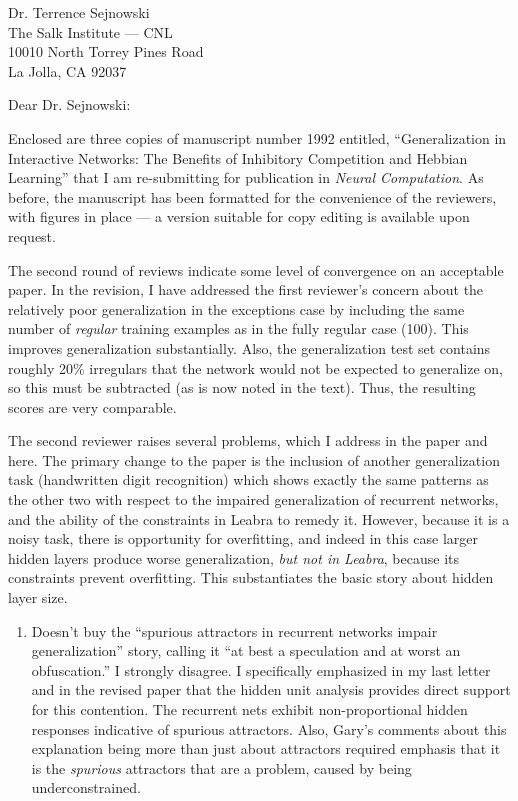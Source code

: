 \documentclass [11pt]{letter}
\begin{document}
\begin{letter}
{Dr. Terrence Sejnowski\\
The Salk Institute --- CNL\\
10010 North Torrey Pines Road\\
La Jolla, CA 92037\\}

\opening{Dear Dr. Sejnowski:}

Enclosed are three copies of manuscript number 1992 entitled,
``Generalization in Interactive Networks: The Benefits of Inhibitory
Competition and Hebbian Learning'' that I am re-submitting for
publication in {\em Neural Computation}.  As before, the manuscript
has been formatted for the convenience of the reviewers, with figures
in place --- a version suitable for copy editing is available upon
request.

The second round of reviews indicate some level of convergence on an
acceptable paper.  In the revision, I have addressed the first
reviewer's concern about the relatively poor generalization in the
exceptions case by including the same number of {\em regular} training
examples as in the fully regular case (100).  This improves
generalization substantially.  Also, the generalization test set
contains roughly 20\% irregulars that the network would not be
expected to generalize on, so this must be subtracted (as is now noted
in the text).  Thus, the resulting scores are very comparable.

The second reviewer raises several problems, which I address in the
paper and here.  The primary change to the paper is the inclusion of
another generalization task (handwritten digit recognition) which
shows exactly the same patterns as the other two with respect to the
impaired generalization of recurrent networks, and the ability of the
constraints in Leabra to remedy it.  However, because it is a noisy
task, there is opportunity for overfitting, and indeed in this case
larger hidden layers produce worse generalization, {\em but not in
  Leabra}, because its constraints prevent overfitting.  This
substantiates the basic story about hidden layer size.

\begin{enumerate}
\item Doesn't buy the ``spurious attractors in recurrent networks
  impair generalization'' story, calling it ``at best a speculation
  and at worst an obfuscation.''  I strongly disagree.  I specifically
  emphasized in my last letter and in the revised paper that the
  hidden unit analysis provides direct support for this contention.
  The recurrent nets exhibit non-proportional hidden responses
  indicative of spurious attractors.  Also, Gary's comments about this
  explanation being more than just about attractors required emphasis
  that it is the {\em spurious} attractors that are a problem, caused
  by being underconstrained.
  

\end{enumerate}
\end{letter}
\end{document}

